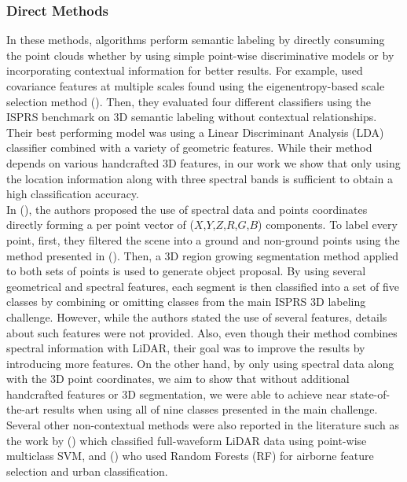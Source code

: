 \documentclass[final,3p,times,twocolumn,authoryear]{elsarticle}
\begin{document}
\subsubsection{Direct Methods}
In these methods, algorithms perform semantic labeling by directly consuming the point clouds whether by using simple point-wise discriminative models or by incorporating contextual information for better results. For example, \citet{Blomley16} used covariance features at multiple scales found using the eigenentropy-based scale selection method (\cite{weinnman2014}). Then, they evaluated four different classifiers using the ISPRS benchmark on 3D semantic labeling without contextual relationships. Their best performing model was using a Linear Discriminant Analysis (LDA) classifier combined with a variety of geometric features. While their method depends on various handcrafted 3D features, in our work we show that only using the location information along with three spectral bands is sufficient to obtain a high classification accuracy.
\\In (\cite{ramiya2014semantic}), the authors proposed the use of spectral data and points coordinates directly forming a per point vector of ($X$,$Y$,$Z$,$R$,$G$,$B$) components. To label every point, first, they filtered the scene into a ground and non-ground points using the method presented in (\cite{axelsson2000generation}). Then, a 3D region growing segmentation method applied to both sets of points is used to generate object proposal. By using several geometrical and spectral features, each segment is then classified into a set of five classes by combining or omitting classes from the main ISPRS 3D labeling challenge. However, while the authors stated the use of several features, details about such features were not provided. Also, even though their method combines spectral information with LiDAR, their goal was to improve the results by introducing more features. On the other hand, by only using spectral data along with the 3D point coordinates, we aim to show that without additional handcrafted features or 3D segmentation, we were able to achieve near state-of-the-art results when using all of nine classes presented in the main challenge. Several other non-contextual methods were also reported in the literature such as the work by (\cite{mallet2010}) which classified full-waveform LiDAR data using point-wise multiclass SVM, and (\cite{Chehata09}) who used Random Forests (RF) for airborne feature selection and urban classification.
\end{document}
